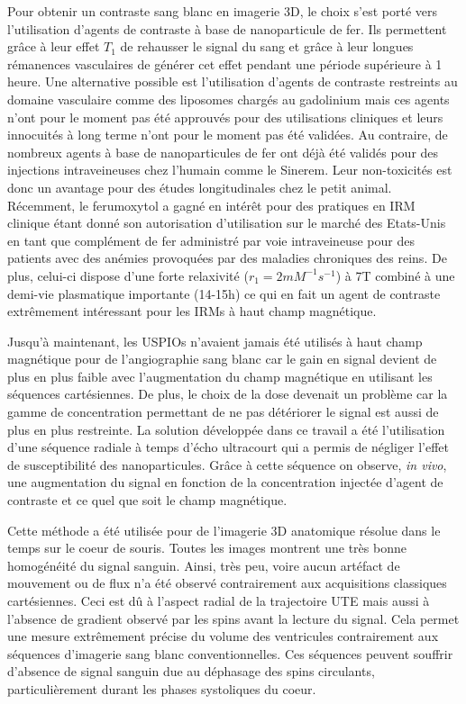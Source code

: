 Pour obtenir un contraste sang blanc en imagerie 3D, le choix s'est porté vers l'utilisation d'agents de contraste à base de nanoparticule de fer. Ils permettent grâce à leur effet $T_1$ de rehausser le signal du sang et grâce à leur longues rémanences vasculaires de générer cet effet pendant une période supérieure à 1 heure. Une alternative possible est l'utilisation d'agents de contraste restreints au domaine vasculaire comme des liposomes chargés au gadolinium \cite{Ersoy:2004aa} mais ces agents n'ont pour le moment pas été approuvés pour des utilisations cliniques et leurs innocuités à long terme n'ont pour le moment pas été validées. Au contraire, de nombreux agents à base de nanoparticules de fer ont déjà été validés pour des injections intraveineuses chez l'humain comme le Sinerem. Leur non-toxicités est donc un avantage pour des études longitudinales chez le petit animal.
Récemment, le ferumoxytol a gagné en intérêt pour des pratiques en IRM clinique \cite{bashir2015emerging} étant donné son autorisation d'utilisation sur le marché des Etats-Unis en tant que complément de fer administré par voie intraveineuse pour des patients avec des anémies provoquées par des maladies chroniques des reins.  De plus, celui-ci dispose d'une forte relaxivité ($r_1= 2 mM^{-1}s^{-1}$) à 7T \cite{Gharagouzloo:2014aa} combiné à une demi-vie plasmatique importante (14-15h) ce qui en fait un agent de contraste extrêmement intéressant pour les IRMs à haut champ magnétique.

Jusqu’à maintenant, les USPIOs n’avaient jamais été utilisés à haut champ magnétique pour de l’angiographie sang blanc car le gain en signal devient de plus en plus faible avec l’augmentation du champ magnétique en utilisant les séquences cartésiennes. De plus, le choix de la dose devenait un problème car la gamme de concentration permettant de ne pas détériorer le signal est aussi de plus en plus restreinte. La solution développée dans ce travail a été l’utilisation d’une séquence radiale à temps d’écho ultracourt qui a permis de négliger l’effet de susceptibilité des nanoparticules. Grâce à cette séquence on observe, \textit{in vivo}, une augmentation du signal en fonction de la concentration injectée d’agent de contraste et ce quel que soit le champ magnétique.

Cette méthode a été utilisée pour de l’imagerie 3D anatomique résolue dans le temps sur le coeur de souris. Toutes les images montrent une très bonne homogénéité du signal sanguin. Ainsi, très peu, voire aucun artéfact de mouvement ou de flux n'a été observé contrairement  aux acquisitions classiques cartésiennes. Ceci est dû à l’aspect radial de la trajectoire UTE mais aussi à l’absence de gradient observé par les spins avant la lecture du signal. Cela permet une mesure extrêmement précise du volume des ventricules contrairement aux séquences d’imagerie sang blanc conventionnelles. Ces séquences peuvent souffrir d’absence de signal sanguin due au déphasage des spins circulants, particulièrement durant les phases systoliques du coeur. 

